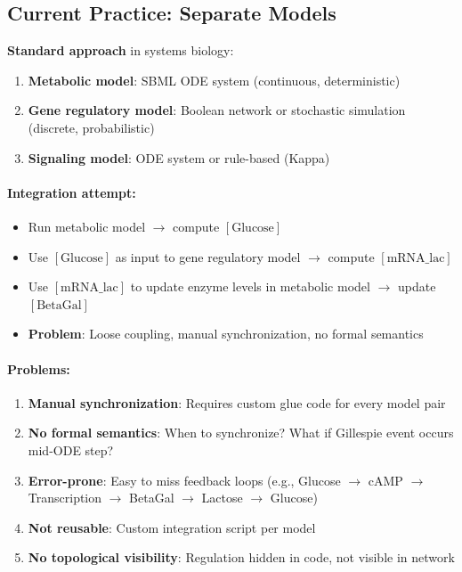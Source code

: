 \subsection{Current Practice: Separate Models}
\label{subsec:separate-models}

\textbf{Standard approach} in systems biology:
\begin{enumerate}
    \item \textbf{Metabolic model}: SBML ODE system (continuous, deterministic)
    \item \textbf{Gene regulatory model}: Boolean network or stochastic simulation (discrete, probabilistic)
    \item \textbf{Signaling model}: ODE system or rule-based (Kappa)
\end{enumerate}

\paragraph{Integration attempt:}
\begin{itemize}
    \item Run metabolic model $\to$ compute $[\text{Glucose}]$
    \item Use $[\text{Glucose}]$ as input to gene regulatory model $\to$ compute $[\text{mRNA\_lac}]$
    \item Use $[\text{mRNA\_lac}]$ to update enzyme levels in metabolic model $\to$ update $[\text{BetaGal}]$
    \item \textbf{Problem}: Loose coupling, manual synchronization, no formal semantics
\end{itemize}

\paragraph{Problems:}
\begin{enumerate}
    \item \textbf{Manual synchronization}: Requires custom glue code for every model pair
    \item \textbf{No formal semantics}: When to synchronize? What if Gillespie event occurs mid-ODE step?
    \item \textbf{Error-prone}: Easy to miss feedback loops (e.g., Glucose $\to$ cAMP $\to$ Transcription $\to$ BetaGal $\to$ Lactose $\to$ Glucose)
    \item \textbf{Not reusable}: Custom integration script per model
    \item \textbf{No topological visibility}: Regulation hidden in code, not visible in network
\end{enumerate}

